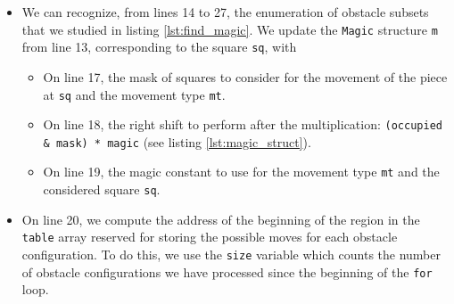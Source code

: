 \documentclass[12pt,a4paper,twoside,openright]{book}
\begin{document}
\begin{itemize}
\item We can recognize, from lines 14 to 27, the enumeration of obstacle subsets that we studied in listing \ref{lst:find_magic}. We update the \texttt{Magic} structure \texttt{m} from line 13, corresponding to the square \texttt{sq}, with
\begin{itemize}
\item On line 17, the mask of squares to consider for the movement of the piece at \texttt{sq} and the movement type \texttt{mt}.
\item On line 18, the right shift to perform after the multiplication: \texttt{(occupied & mask) * magic} (see listing \ref{lst:magic_struct}).
\item On line 19, the magic constant to use for the movement type \texttt{mt} and the considered square \texttt{sq}.
\end{itemize}

\item On line 20, we compute the address of the beginning of the region in the \texttt{table} array reserved for storing the possible moves for each obstacle configuration. To do this, we use the \texttt{size} variable which counts the number of obstacle configurations we have processed since the beginning of the \texttt{for} loop.


\end{itemize}
\end{document}

